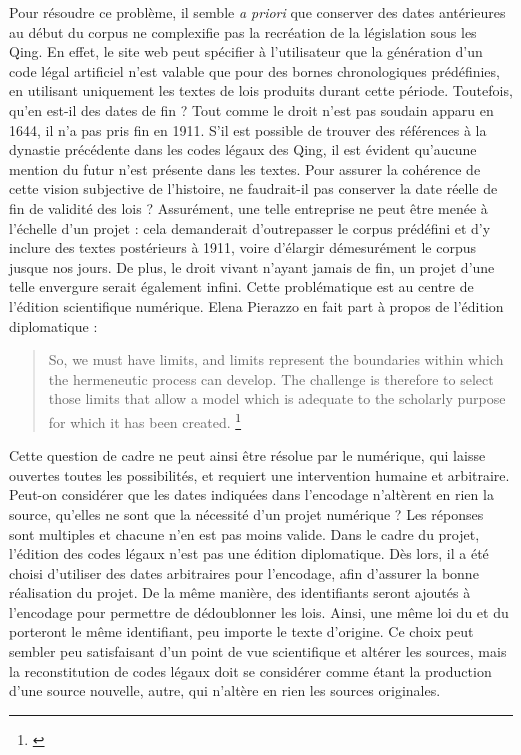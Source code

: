 Pour résoudre ce problème, il semble \textit{a priori} que conserver des dates antérieures au début du corpus ne complexifie pas la recréation de la législation sous les Qing. En effet, le site web peut spécifier à l'utilisateur que la génération d'un code légal artificiel n'est valable que pour des bornes chronologiques prédéfinies, en utilisant uniquement les textes de lois produits durant cette période. Toutefois, qu'en est-il des dates de fin ? Tout comme le droit n'est pas soudain apparu en 1644, il n'a pas pris fin en 1911. S'il est possible de trouver des références à la dynastie précédente dans les codes légaux des Qing, il est évident qu'aucune mention du futur n'est présente dans les textes. Pour assurer la cohérence de cette vision subjective de l'histoire, ne faudrait-il pas conserver la date réelle de fin de validité des lois ? Assurément, une telle entreprise ne peut être menée à l'échelle d'un projet : cela demanderait d'outrepasser le corpus prédéfini et d'y inclure des textes postérieurs à 1911, voire d'élargir démesurément le corpus jusque nos jours. De plus, le droit vivant n'ayant jamais de fin, un projet d'une telle envergure serait également infini. Cette problématique est au centre de l'édition scientifique numérique. Elena Pierazzo en fait part à propos de l'édition diplomatique : 

\begin{quote}
    So, we must have limits, and limits represent the boundaries within which the hermeneutic
process can develop. The challenge is therefore to select those limits that allow a model
which is adequate to the scholarly purpose for which it has been created.
\footnote{\cite{pierazzo_rationale_2011}}
\end{quote}

Cette question de cadre ne peut ainsi être résolue par le numérique, qui laisse ouvertes toutes les possibilités, et requiert une intervention humaine et arbitraire. Peut-on considérer que les dates indiquées dans l'encodage n'altèrent en rien la source, qu'elles ne sont que la nécessité d'un projet numérique ? Les réponses sont multiples et chacune n'en est pas moins valide. Dans le cadre du projet, l'édition des codes légaux n'est pas une édition diplomatique. Dès lors, il a été choisi d'utiliser des dates arbitraires pour l'encodage, afin d'assurer la bonne réalisation du projet. De la même manière, des identifiants \XML seront ajoutés à l'encodage \TEI pour permettre de dédoublonner les lois. Ainsi, une même loi du \huidian et du \dc porteront le même identifiant, peu importe le texte d'origine. Ce choix peut sembler peu satisfaisant d'un point de vue scientifique et altérer les sources, mais la reconstitution de codes légaux doit se considérer comme étant la production d'une source nouvelle, autre, qui n'altère en rien les sources originales. 
